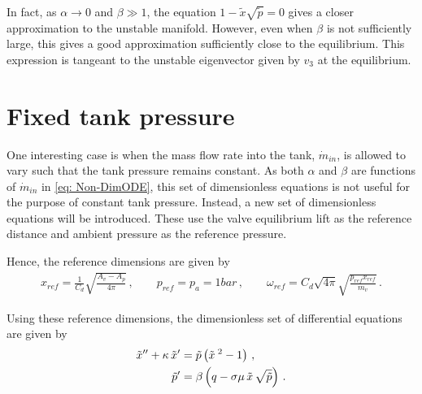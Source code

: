 In fact, as $\alpha \rightarrow 0$ and $\beta \gg 1$, the equation $1 - \tilde{x} \sqrt{\tilde{p}} = 0$ gives a closer approximation to the unstable manifold. However, even when $\beta$ is not sufficiently large, this gives a good approximation sufficiently close to the equilibrium. This expression is tangeant to the unstable eigenvector given by $v_3$ at the equilibrium.

% 

\section{Fixed tank pressure}

One interesting case is when the mass flow rate into the tank, $\dot{m}_{in}$, is allowed to vary such that the tank pressure remains constant. As both $\alpha$ and $\beta$ are functions of $\dot{m}_{in}$ in \cref{eq: Non-DimODE}, this set of dimensionless equations is not useful for the purpose of constant tank pressure. Instead, a new set of dimensionless equations will be introduced. These use the valve equilibrium lift as the reference distance and ambient pressure as the reference pressure.

Hence, the reference dimensions are given by
~
\begin{equation*}
\begin{split}
    x_{ref} = \frac{1}{C_d} \sqrt{\frac{A_v - A_p}{4 \pi}}
    \, , \qquad
    p_{ref} = p_a = 1 \si{bar}
    \, , \qquad
    \omega_{ref} = C_d \sqrt{4 \pi} \sqrt{\frac{p_{ref} x_{ref}}{m_v}} \, .
\end{split}
\end{equation*}

Using these reference dimensions, the dimensionless set of differential equations are given by
~
\begin{equation} \label{eq: AltNonDim}
\begin{split}
    \tilde{x}{''} + \kappa \, \tilde{x}{'} &=  \tilde{p} \left( \tilde{x}^{\;2}  - 1 \right) \, , \\
    \tilde{p}{'} &= \beta \left( q - \sigma \mu \, \tilde{x} \, \sqrt{\tilde{p}} \right) \, .
\end{split}
\end{equation}

